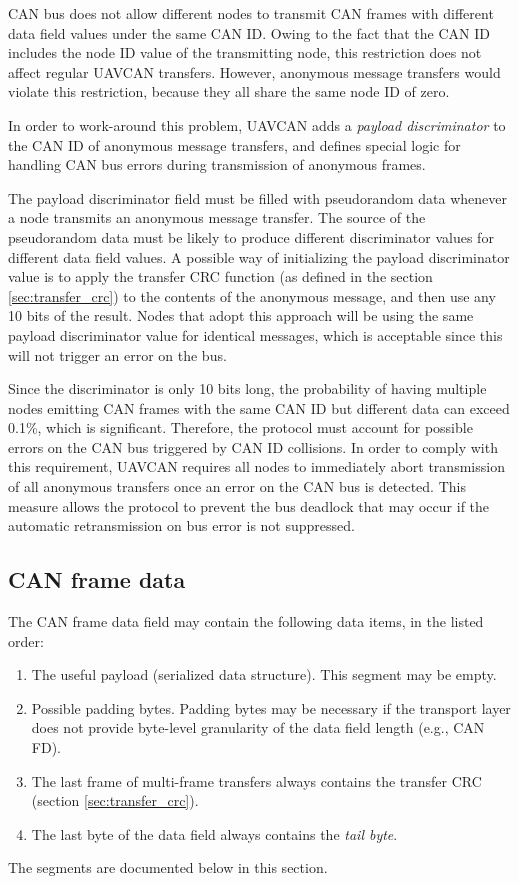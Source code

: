 CAN bus does not allow different nodes to transmit CAN frames with different data field values under the same CAN ID.
Owing to the fact that the CAN ID includes the node ID value of the transmitting node,
this restriction does not affect regular UAVCAN transfers.
However, anonymous message transfers would violate this restriction,
because they all share the same node ID of zero.

In order to work-around this problem,
UAVCAN adds a \emph{payload discriminator} to the CAN ID of anonymous message transfers,
and defines special logic for handling CAN bus errors during transmission of anonymous frames.

The payload discriminator field must be filled with pseudorandom data whenever a node transmits an
anonymous message transfer.
The source of the pseudorandom data must be likely to produce different discriminator values
for different data field values.
A possible way of initializing the payload discriminator value is to apply the transfer CRC function
(as defined in the section \ref{sec:transfer_crc})
to the contents of the anonymous message, and then use any 10 bits of the result.
Nodes that adopt this approach will be using the same payload discriminator value for identical messages,
which is acceptable since this will not trigger an error on the bus.

Since the discriminator is only 10 bits long,
the probability of having multiple nodes emitting CAN frames with the same CAN ID
but different data can exceed 0.1\%, which is significant.
Therefore, the protocol must account for possible errors on the CAN bus triggered by CAN ID collisions.
In order to comply with this requirement,
UAVCAN requires all nodes to immediately abort transmission of all anonymous transfers once an error on
the CAN bus is detected.
This measure allows the protocol to prevent the bus deadlock that may occur if the automatic
retransmission on bus error is not suppressed.

\subsection{CAN frame data}

The CAN frame data field may contain the following data items, in the listed order:
\begin{enumerate}
    \item The useful payload (serialized data structure). This segment may be empty.
    \item Possible padding bytes.
          Padding bytes may be necessary if the transport layer does not provide byte-level
          granularity of the data field length (e.g., CAN FD).
    \item The last frame of multi-frame transfers always contains the transfer CRC (section \ref{sec:transfer_crc}).
    \item The last byte of the data field always contains the \emph{tail byte}.
\end{enumerate}
The segments are documented below in this section.

